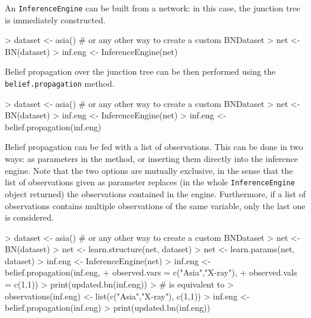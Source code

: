 \documentclass{article}
\newcommand{\Robject}[1]{{\texttt{#1}}}
\newcommand{\Rmethod}[1]{{\texttt{#1}}}
\begin{document}
An \Robject{InferenceEngine} can be built from a network: in this case, the junction tree is immediately constructed.
\begin{Schunk}
\begin{Sinput}
> dataset <- asia() # or any other way to create a custom BNDataset
> net     <- BN(dataset)
> inf.eng <- InferenceEngine(net)
\end{Sinput}
\end{Schunk}

Belief propagation over the junction tree can be then performed using the \Rmethod{belief.propagation} method.
\begin{Schunk}
\begin{Sinput}
> dataset <- asia() # or any other way to create a custom BNDataset
> net     <- BN(dataset)
> inf.eng <- InferenceEngine(net)
> inf.eng <- belief.propagation(inf.eng)
\end{Sinput}
\end{Schunk}

Belief propagation can be fed with a list of observations. This can be done in two ways: as parameters in the method,
or inserting them directly into the inference engine. Note that the two options are mutually exclusive, in the sense that
the list of observations given as parameter replaces (in the whole \Robject{InferenceEngine} object returned)
the observations contained in the engine. Furthermore, if a list of observations contains multiple observations
of the same variable, only the last one is considered.
\begin{Schunk}
\begin{Sinput}
> dataset <- asia() # or any other way to create a custom BNDataset
> net     <- BN(dataset)
> net     <- learn.structure(net, dataset)
> net     <- learn.params(net, dataset)
> inf.eng <- InferenceEngine(net)
> inf.eng <- belief.propagation(inf.eng,
+                               observed.vars = c("Asia","X-ray"),
+                               observed.vals = c(1,1))
> print(updated.bn(inf.eng))
> # is equivalent to
> observations(inf.eng) <- list(c("Asia","X-ray"), c(1,1))
> inf.eng <- belief.propagation(inf.eng)
> print(updated.bn(inf.eng))
\end{Sinput}
\end{Schunk}
\end{document}

